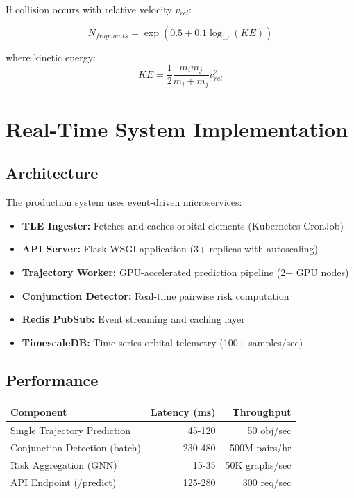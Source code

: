 \documentclass[10pt,conference]{IEEEtran}
\begin{document}
If collision occurs with relative velocity $v_{rel}$:

\begin{equation}
N_{fragments} = \exp(0.5 + 0.1 \log_{10}(KE))
\end{equation}

where kinetic energy:
\begin{equation}
KE = \frac{1}{2}\frac{m_i m_j}{m_i + m_j}v_{rel}^2
\end{equation}

\section{Real-Time System Implementation}

\subsection{Architecture}

The production system uses event-driven microservices:

\begin{itemize}
  \item \textbf{TLE Ingester:} Fetches and caches orbital elements (Kubernetes CronJob)
  \item \textbf{API Server:} Flask WSGI application (3+ replicas with autoscaling)
  \item \textbf{Trajectory Worker:} GPU-accelerated prediction pipeline (2+ GPU nodes)
  \item \textbf{Conjunction Detector:} Real-time pairwise risk computation
  \item \textbf{Redis PubSub:} Event streaming and caching layer
  \item \textbf{TimescaleDB:} Time-series orbital telemetry (100+ samples/sec)
\end{itemize}

\subsection{Performance}

\begin{table}[h]
\centering
\begin{tabular}{lrr}
\hline
\textbf{Component} & \textbf{Latency (ms)} & \textbf{Throughput} \\
\hline
Single Trajectory Prediction & 45-120 & 50 obj/sec \\
Conjunction Detection (batch) & 230-480 & 500M pairs/hr \\
Risk Aggregation (GNN) & 15-35 & 50K graphs/sec \\
API Endpoint (/predict) & 125-280 & 300 req/sec \\
\hline
\end{tabular}
\end{table}
\end{document}
